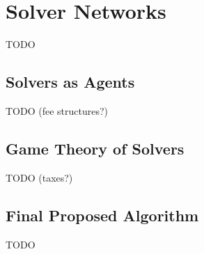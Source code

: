 \section{Solver Networks}\label{sec:solver-networks}

TODO

\subsection{Solvers as Agents}\label{sec:solver-agents}

TODO (fee structures?)

\subsection{Game Theory of Solvers}\label{sec:game-theory}

TODO (taxes?)

\subsection{Final Proposed Algorithm}\label{sec:final-algorithm}

TODO